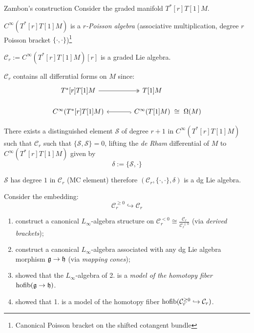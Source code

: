 \documentclass[beamer,10pt]{standalone}
\begin{document}
\begin{frame}{Zambon's construction}
	Consider the graded manifold $T^*[r]T[1]M$.
	\vfill

	$C^\infty(T^*[r]T[1]M)$ is a \emph{$r$-Poisson algebra} (associative multiplication, degree $r$ Poisson bracket $\lbrace \cdot,\cdot\rbrace$)\footnote{Canonical Poisson bracket on the shifted cotangent bundle}
	\vfill

	$\mathcal{C}_r := C^\infty(T^*[r]T[1]M)[r]$ is a graded Lie algebra.
	\vfill

	$\mathcal{C}_r$ contains all differntial forms on $M$ since:
	\begin{displaymath}
		\begin{tikzcd}[ampersand replacement=\&,column sep = large]
			T^*[r]T[1]M \ar[r, two heads,] \& T[1]M \&[-2.5em] \\[-.5em]
			C^\infty(T^*[r]T[1]M) \& C^\infty(T[1]M) \ar[l,hook]\ar[r,phantom,"\cong"] \& \Omega(M) 
 		\end{tikzcd}
	\end{displaymath}

\end{frame}

\begin{frame}
	There exists a distinguished element $\mathcal{S}$ of degree $r+1$ in $C^\infty(T^*[r]T[1]M)$ such that $\mathcal{C}_r$ such that $\lbrace \mathcal{S},\mathcal{S}\rbrace =0 $, lifting the \emph{de Rham} differential of $M$ to $C^\infty(T^*[r]T[1]M)$ given by 
	$$ \delta := \lbrace \mathcal{S},\cdot \rbrace$$
	\vfill

	$\mathcal{S}$ has degree $1$ in $\mathcal{C}_r$ (MC element) therefore $(\mathcal{C}_r,\lbrace \cdot,\cdot\rbrace,\delta)$ is a dg Lie algebra.
	\vfill

	Consider the embedding: $$ \mathcal{C}_r^{\geq 0} \hookrightarrow \mathcal{C}_r$$
	\begin{enumerate}
		\item \cite{Getzler1991} construct a canonical $L_\infty$-algebra structure on $\mathcal{C}_r^{<0}\cong \frac{\mathcal{C}_r }{\mathcal{C}_r^{\geq 0}}$ (via \emph{derived brackets});
		\item \cite{Fiorenza2006} construct a canonical $L_\infty$-algebra associated with any dg Lie algebra morphism $\mathfrak{g} \to \mathfrak{h}$ (via \emph{mapping cones});
		\item \cite{boh} showed that the $L_\infty$-algebra  of 2. is a \emph{model of the homotopy fiber $\mathrm{hofib}(\mathfrak{g} \to \mathfrak{h})$}.
		\item \cite{Bandiera2015} showed that 1. is a model of the homotopy fiber $\mathrm{hofib}(\mathcal{C}_r^{\geq 0} \hookrightarrow \mathcal{C}_r)$.
	\end{enumerate}
\end{frame}
\end{document}
